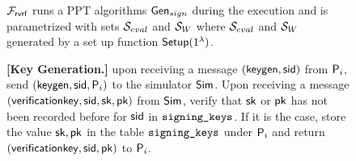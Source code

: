 

\begin{figure}
\footnotesize
	\begin{tcolorbox}[left=2pt,right=2pt]
		{  $ \mathcal{F}_{\textsf{rvrf}} $ runs a PPT algorithms  $\mathsf{Gen}_{sign} $ during the execution and is parametrized with  sets $ {\mathcal{S}}_{eval} $ and $ {\mathcal{S}}_W $ where $ {\mathcal{S}}_{eval} $ and $ {\mathcal{S}}_W $ generated by a set up function $ \mathsf{Setup}(1^\lambda) $.
	
		\textbf{[Key Generation.]} upon receiving a message $(\mathsf{keygen}, \textsf{sid})$ from  $\mathsf{P}_i$, send $(\mathsf{keygen}, \textsf{sid}, \mathsf{P}_i)$ to the simulator $\mathsf{Sim}$.
		Upon receiving a message $(\mathsf{verificationkey}, \textsf{sid}, \mathsf{sk},\mathsf{pk})$ from $\mathsf{Sim}$, verify that $\mathsf{sk} $ or $\mathsf{pk}$ has not been recorded before for $ \textsf{sid} $ in $ \texttt{signing\_keys} $. If it is the case, store  the value $\mathsf{sk},\mathsf{pk}$ in the table $\texttt{signing\_keys}$ under $\mathsf{P}_i$ and return $(\mathsf{verificationkey}, \textsf{sid}, \mathsf{pk})$ to $ \mathsf{P}_i$.
			
			
}
\end{tcolorbox}
\end{figure}
